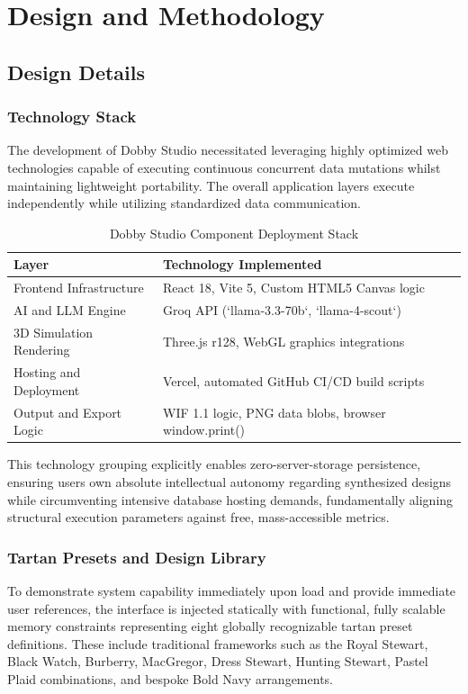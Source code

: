 \chapter{Design and Methodology}

\section{Design Details}

\subsection{Technology Stack}
The development of Dobby Studio necessitated leveraging highly optimized web technologies capable of executing continuous concurrent data mutations whilst maintaining lightweight portability. The overall application layers execute independently while utilizing standardized data communication.

\begin{table}[H]
\centering
\caption{Dobby Studio Component Deployment Stack}
\begin{tabular}{|l|l|}
\hline
\textbf{Layer} & \textbf{Technology Implemented} \\
\hline
Frontend Infrastructure & React 18, Vite 5, Custom HTML5 Canvas logic \\
\hline
AI and LLM Engine & Groq API (`llama-3.3-70b`, `llama-4-scout`) \\
\hline
3D Simulation Rendering & Three.js r128, WebGL graphics integrations \\
\hline
Hosting and Deployment & Vercel, automated GitHub CI/CD build scripts \\
\hline
Output and Export Logic & WIF 1.1 logic, PNG data blobs, browser window.print() \\
\hline
\end{tabular}
\end{table}

This technology grouping explicitly enables zero-server-storage persistence, ensuring users own absolute intellectual autonomy regarding synthesized designs while circumventing intensive database hosting demands, fundamentally aligning structural execution parameters against free, mass-accessible metrics.

\subsection{Tartan Presets and Design Library}
To demonstrate system capability immediately upon load and provide immediate user references, the interface is injected statically with functional, fully scalable memory constraints representing eight globally recognizable tartan preset definitions. These include traditional frameworks such as the Royal Stewart, Black Watch, Burberry, MacGregor, Dress Stewart, Hunting Stewart, Pastel Plaid combinations, and bespoke Bold Navy arrangements. 

